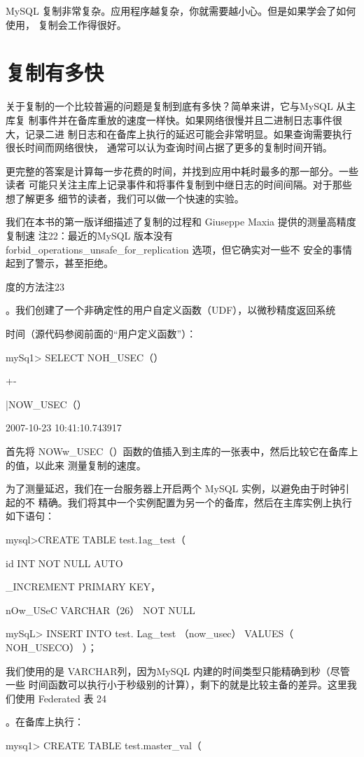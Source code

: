 MySQL 复制非常复杂。应用程序越复杂，你就需要越小心。但是如果学会了如何使用，
复制会工作得很好。

\section{复制有多快}
关于复制的一个比较普遍的问题是复制到底有多快？简单来讲，它与MySQL 从主库复
制事件并在备库重放的速度一样快。如果网络很慢并且二进制日志事件很大，记录二进
制日志和在备库上执行的延迟可能会非常明显。如果查询需要执行很长时间而网络很快，
通常可以认为查询时间占据了更多的复制时间开销。

更完整的答案是计算每一步花费的时间，并找到应用中耗时最多的那一部分。一些读者
可能只关注主库上记录事件和将事件复制到中继日志的时间间隔。对于那些想了解更多
细节的读者，我们可以做一个快速的实验。

我们在本书的第一版详细描述了复制的过程和 Giuseppe Maxia 提供的测量高精度复制速
注22：最近的MySQL 版本没有 forbid\_operations\_unsafe\_for\_replication 选项，但它确实对一些不
安全的事情起到了警示，甚至拒绝。

度的方法注23

。我们创建了一个非确定性的用户自定义函数（UDF），以微秒精度返回系统

时间（源代码参阅前面的“用户定义函数”）：

mySq1> SELECT NOH\_USEC（）

+-

|NOW\_USEC（）

2007-10-23 10:41:10.743917

首先将 NOWw\_USEC（）函数的值插入到主库的一张表中，然后比较它在备库上的值，以此来
测量复制的速度。

为了测量延迟，我们在一台服务器上开启两个 MySQL 实例，以避免由于时钟引起的不
精确。我们将其中一个实例配置为另一个的备库，然后在主库实例上执行如下语句：

mysql>CREATE TABLE test.1ag\_test（

id INT NOT NULL AUTO

\_INCREMENT PRIMARY KEY，

nOw\_USeC VARCHAR（26） NOT NULL

mySqL> INSERT INTO test. Lag\_test （now\_usec） VALUES（ NOH\_USECO） ）；

我们使用的是 VARCHAR列，因为MySQL 内建的时间类型只能精确到秒（尽管一些
时间函数可以执行小于秒级别的计算），剩下的就是比较主备的差异。这里我们使用
Federated 表 24

。在备库上执行：

mysq1> CREATE TABLE test.master\_val（


